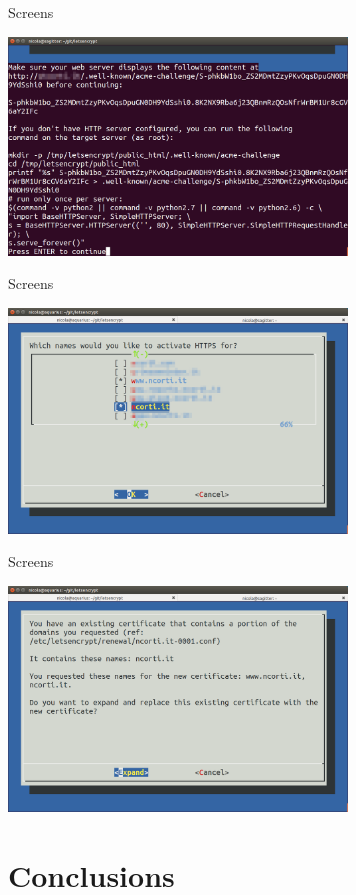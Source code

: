 \documentclass[xcolor=svgnames,11pt]{beamer}
\begin{document}
\begin{frame}{Screens}
\begin{center}
\includegraphics[width=9cm]{img/screen4.png}
\end{center}
\end{frame}
\begin{frame}{Screens}
\begin{center}
\includegraphics[width=9cm]{img/screen5.png}
\end{center}
\end{frame}
\begin{frame}{Screens}
\begin{center}
\includegraphics[width=9cm]{img/screen6.png}
\end{center}
\end{frame}


\section{Conclusions}
\end{document}
